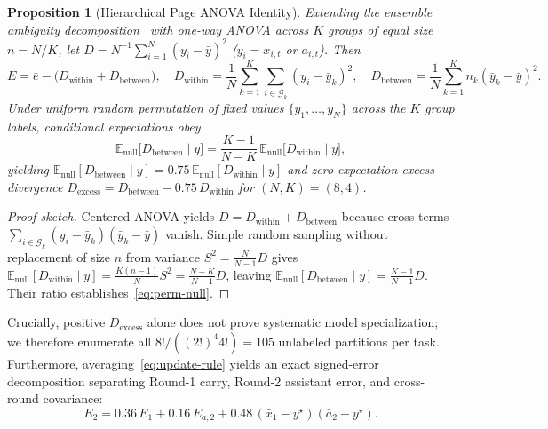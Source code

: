 \documentclass[11pt,letterpaper]{article}
\theoremstyle{plain}
\newtheorem{proposition}{Proposition}
\begin{document}
\begin{proposition}[Hierarchical Page ANOVA Identity]\label{prop:hier-page}
Extending the ensemble ambiguity decomposition~\citep{krogh1995neural,page2007difference} with one-way ANOVA across $K$ groups of equal size $n=N/K$, let $D = N^{-1}\sum_{i=1}^N (y_i - \bar{y})^2$ ($y_i=x_{i,t}$ or $a_{i,t}$). Then
\begin{equation}\label{eq:hier-page}
  E = \bar{e} - \bigl(D_{\text{within}} + D_{\text{between}}\bigr), \quad
  D_{\text{within}} = \frac{1}{N}\sum_{k=1}^K \sum_{i\in \mathcal{G}_k}(y_i - \bar{y}_k)^2, \quad
  D_{\text{between}} = \frac{1}{N}\sum_{k=1}^K n_k(\bar{y}_k - \bar{y})^2.
\end{equation}
Under uniform random permutation of fixed values $\{y_1,\dots,y_N\}$ across the $K$ group labels, conditional expectations obey
\begin{equation}\label{eq:perm-null}
  \mathbb{E}_{\text{null}}\bigl[D_{\text{between}} \mid y\bigr] = \frac{K-1}{N-K}\,\mathbb{E}_{\text{null}}\bigl[D_{\text{within}} \mid y\bigr],
\end{equation}
yielding $\mathbb{E}_{\text{null}}[D_{\text{between}} \mid y] = 0.75\,\mathbb{E}_{\text{null}}[D_{\text{within}} \mid y]$ and zero-expectation excess divergence $D_{\text{excess}} = D_{\text{between}} - 0.75\,D_{\text{within}}$ for $(N,K)=(8,4)$.
\end{proposition}
\begin{proof}[Proof sketch]
Centered ANOVA yields $D = D_{\text{within}} + D_{\text{between}}$ because cross-terms $\sum_{i\in\mathcal{G}_k}(y_i - \bar{y}_k)(\bar{y}_k - \bar{y})$ vanish. Simple random sampling without replacement of size $n$ from variance $S^2 = \frac{N}{N-1}D$ gives $\mathbb{E}_{\text{null}}[D_{\text{within}} \mid y] = \frac{K(n-1)}{N}S^2 = \frac{N-K}{N-1}D$, leaving $\mathbb{E}_{\text{null}}[D_{\text{between}} \mid y] = \frac{K-1}{N-1}D$. Their ratio establishes~\eqref{eq:perm-null}.
\end{proof}

Crucially, positive $D_{\text{excess}}$ alone does not prove systematic model specialization; we therefore enumerate all $8!/((2!)^4 4!) = 105$ unlabeled partitions per task. Furthermore, averaging~\eqref{eq:update-rule} yields an exact signed-error decomposition separating Round-1 carry, Round-2 assistant error, and cross-round covariance:
\begin{equation}\label{eq:cross-term}
  E_2 = 0.36\,E_1 + 0.16\,E_{a,2} + 0.48\,(\bar{x}_1 - y^\star)(\bar{a}_2 - y^\star).
\end{equation}
\end{document}
